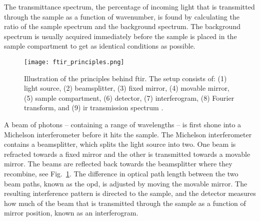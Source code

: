 The transmittance spectrum, the percentage of incoming light that is transmitted through the sample as a function of wavenumber, is found by calculating the ratio of the sample spectrum and the background spectrum. The background spectrum is usually acquired immediately before the sample is placed in the sample compartment to get as identical conditions as possible.

\begin{figure}[htbp]
    \centering
    \texttt{[image: ftir\_principles.png]}
    \caption[Illustration of the principles behind \ac{ftir}.]{Illustration of the principles behind \ac{ftir}. The setup consists of: (1) light source, (2) beamsplitter, (3) fixed mirror, (4) movable mirror, (5) sample compartment, (6) detector, (7) interferogram, (8) Fourier transform, and (9) \ac{ir} transmission spectrum \citep[Adapted from][]{nicolet2001introduction}.}%
    \label{fig:ftir_michelson}
\end{figure}

A beam of photons -- containing a range of wavelengths -- is first shone into a Michelson interferometer before it hits the sample. The Michelson interferometer contains a beamsplitter, which splits the light source into two. One beam is refracted towards a fixed mirror and the other is transmitted towards a movable mirror. The beams are reflected back towards the beamsplitter where they recombine, see Fig.~\ref{fig:ftir_michelson}. The difference in optical path length between the two beam paths, known as the \ac{opd}, is adjusted by moving the movable mirror. The resulting interference pattern is directed to the sample, and the detector measures how much of the beam that is transmitted through the sample as a function of mirror position, known as an interferogram.

